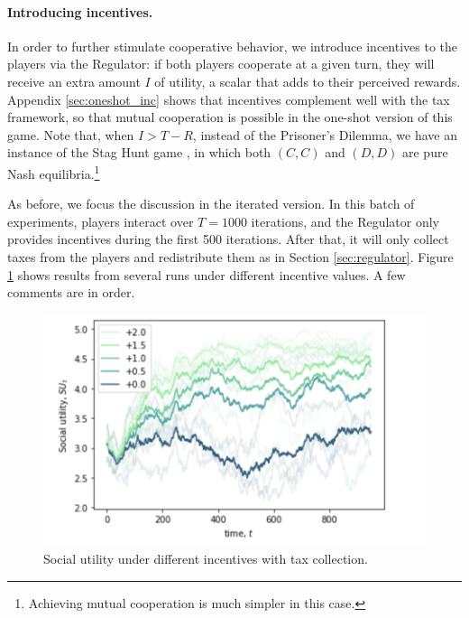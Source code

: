 



\paragraph{Introducing incentives.}\label{sec:incentives}


In order to further stimulate cooperative behavior, we introduce incentives to the players via the Regulator: if both players cooperate at a given turn, they will receive an extra amount $I$ of utility,
 a scalar that adds to their perceived rewards. Appendix  \ref{sec:oneshot_inc} shows that incentives complement well with the tax framework, so that mutual cooperation is possible in the one-shot version of this game. Note that, when $I>T-R$, instead of the Prisoner's Dilemma, we have an instance of the Stag Hunt game \parencite{skyrms2004stag}, in which both $(C, C)$ and $(D, D)$ are 
 pure Nash equilibria.\footnote{Achieving mutual cooperation is much simpler in this case.}

As before, we focus the discussion in the iterated version.
In this batch of experiments, players interact over $T=1000$ iterations, and the Regulator only provides incentives during the first 500 iterations. After that, it will only collect taxes from the players and redistribute them as in Section \ref{sec:regulator}. Figure \ref{fig:inc1} shows
results from 
several runs under different incentive values. A few comments are in order.

\begin{figure}[!h]
\centering
\includegraphics[width=0.6\linewidth]{img/inc1.png}
\caption{Social utility under different incentives with tax collection.}\label{fig:inc1}
\end{figure}

